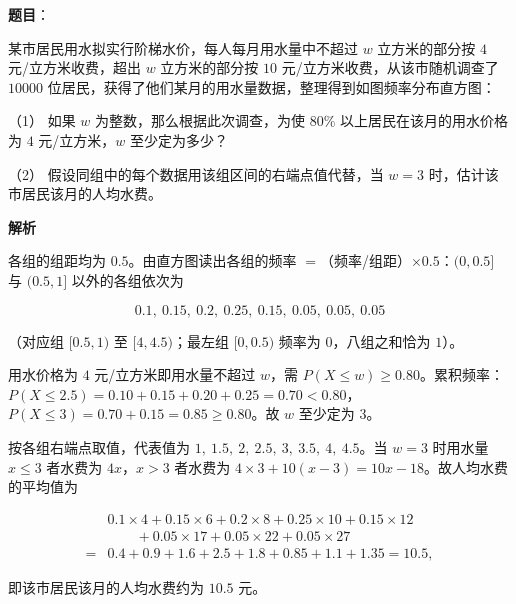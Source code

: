 \begin{answer}

\textbf{题目}：

某市居民用水拟实行阶梯水价，每人每月用水量中不超过 \(w\) 立方米的部分按 \(4\) 元/立方米收费，超出 \(w\) 立方米的部分按 \(10\) 元/立方米收费，从该市随机调查了 \(10000\) 位居民，获得了他们某月的用水量数据，整理得到如图频率分布直方图：
\nopagebreak[4]
\begin{center}\end{center}
\nopagebreak[4]
（1） 如果 \(w\) 为整数，那么根据此次调查，为使 80\% 以上居民在该月的用水价格为 \(4\) 元/立方米，\(w\) 至少定为多少？

（2） 假设同组中的每个数据用该组区间的右端点值代替，当 \(w=3\) 时，估计该市居民该月的人均水费。

\textbf{解析}

各组的组距均为 \(0.5\)。由直方图读出各组的频率 \(=\)（频率/组距）\(\times0.5\)：\((0,0.5]\) 与 \((0.5,1]\) 以外的各组依次为

\nopagebreak[4]
\[
0.1,\ 0.15,\ 0.2,\ 0.25,\ 0.15,\ 0.05,\ 0.05,\ 0.05
\]

（对应组 \([0.5,1)\) 至 \([4,4.5)\)；最左组 \([0,0.5)\) 频率为 \(0\)，八组之和恰为 \(1\)）。


用水价格为 \(4\) 元/立方米即用水量不超过 \(w\)，需 \(P(X\leqslant w)\geqslant0.80\)。累积频率：\(P(X\leqslant2.5)=0.10+0.15+0.20+0.25=0.70<0.80\)，\(P(X\leqslant3)=0.70+0.15=0.85\geqslant0.80\)。故 \(w\) 至少定为 \(3\)。



按各组右端点取值，代表值为 \(1,\ 1.5,\ 2,\ 2.5,\ 3,\ 3.5,\ 4,\ 4.5\)。当 \(w=3\) 时用水量 \(x\leqslant3\) 者水费为 \(4x\)，\(x>3\) 者水费为 \(4\times3+10(x-3)=10x-18\)。故人均水费的平均值为

\nopagebreak[4]
\[
\begin{aligned}
&0.1\times4+0.15\times6+0.2\times8+0.25\times10+0.15\times12\\
&\qquad{}+0.05\times17+0.05\times22+0.05\times27\\
={}&0.4+0.9+1.6+2.5+1.8+0.85+1.1+1.35=10.5,
\end{aligned}
\]

即该市居民该月的人均水费约为 \(10.5\) 元。



\end{answer}
